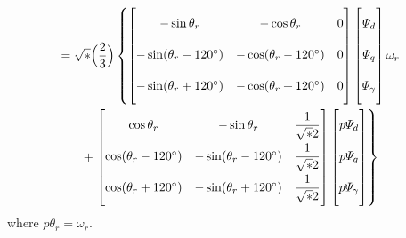 \documentclass[a4paper,numbers=noenddot,12pt]{scrbook}
\begin{document}
    \begin{multline}
        [v_{abc}] = \sqrt*{\Big( \dfrac{2}{3} \Big)} 
        \left\{
            \begin{bmatrix}
                -\sin \theta_r & -\cos \theta_r & 0 \vphantom{\dfrac{1}{\sqrt*{2}}}\\[2ex]
                -\sin (\theta_r - 120^{\circ}) & -\cos (\theta_r - 120^{\circ}) & 0 \vphantom{\dfrac{1}{\sqrt*{2}}}\\[2ex]
                -\sin (\theta_r + 120^{\circ}) & -\cos (\theta_r + 120^{\circ}) & 0 \vphantom{\dfrac{1}{\sqrt*{2}}}
            \end{bmatrix}
            \begin{bmatrix}
                \varPsi_d \vphantom{\dfrac{1}{\sqrt*{2}}} \\[2ex] 
                \varPsi_q \vphantom{\dfrac{1}{\sqrt*{2}}}\\[2ex]
                \varPsi_{\gamma} \vphantom{\dfrac{1}{\sqrt*{2}}}
            \end{bmatrix}
            \omega_r
            \right.
            \\
            +
            \left.
            \begin{bmatrix}
                \cos \theta_r & -\sin \theta_r & \dfrac{1}{\sqrt*{2}} \\[2ex]
                \cos (\theta_r - 120^{\circ}) & -\sin (\theta_r - 120^{\circ}) & \dfrac{1}{\sqrt*{2}} \\[2ex]
                \cos (\theta_r + 120^{\circ}) & -\sin (\theta_r + 120^{\circ}) & \dfrac{1}{\sqrt*{2}}
            \end{bmatrix}
            \begin{bmatrix}
                p \varPsi_d \vphantom{\dfrac{1}{\sqrt*{2}}} \\[2ex] p \varPsi_q \vphantom{\dfrac{1}{\sqrt*{2}}}\\[2ex] p \varPsi_{\gamma} \vphantom{\dfrac{1}{\sqrt*{2}}}
            \end{bmatrix}
        \right\}
        \label{}
    \end{multline}
    where $p\theta_r = \omega_r$.
\end{document}
